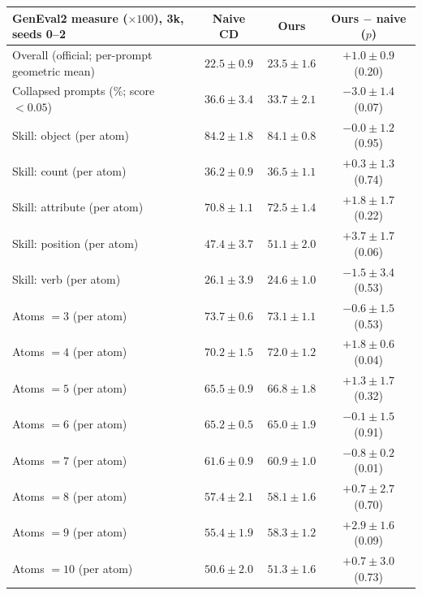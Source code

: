 \begin{tabular}{l c c c}
\toprule
GenEval2 measure ($\times100$), 3k, seeds 0--2 & Naive CD & Ours & Ours $-$ naive ($p$) \\
\midrule
Overall (official; per-prompt geometric mean) & $22.5\pm0.9$ & $23.5\pm1.6$ & $+1.0\pm0.9$ (0.20) \\
Collapsed prompts (\%; score $<0.05$) & $36.6\pm3.4$ & $33.7\pm2.1$ & $-3.0\pm1.4$ (0.07) \\
\midrule
Skill: object (per atom) & $84.2\pm1.8$ & $84.1\pm0.8$ & $-0.0\pm1.2$ (0.95) \\
Skill: count (per atom) & $36.2\pm0.9$ & $36.5\pm1.1$ & $+0.3\pm1.3$ (0.74) \\
Skill: attribute (per atom) & $70.8\pm1.1$ & $72.5\pm1.4$ & $+1.8\pm1.7$ (0.22) \\
Skill: position (per atom) & $47.4\pm3.7$ & $51.1\pm2.0$ & $+3.7\pm1.7$ (0.06) \\
Skill: verb (per atom) & $26.1\pm3.9$ & $24.6\pm1.0$ & $-1.5\pm3.4$ (0.53) \\
\midrule
Atoms $=3$ (per atom) & $73.7\pm0.6$ & $73.1\pm1.1$ & $-0.6\pm1.5$ (0.53) \\
Atoms $=4$ (per atom) & $70.2\pm1.5$ & $72.0\pm1.2$ & $+1.8\pm0.6$ (0.04) \\
Atoms $=5$ (per atom) & $65.5\pm0.9$ & $66.8\pm1.8$ & $+1.3\pm1.7$ (0.32) \\
Atoms $=6$ (per atom) & $65.2\pm0.5$ & $65.0\pm1.9$ & $-0.1\pm1.5$ (0.91) \\
Atoms $=7$ (per atom) & $61.6\pm0.9$ & $60.9\pm1.0$ & $-0.8\pm0.2$ (0.01) \\
Atoms $=8$ (per atom) & $57.4\pm2.1$ & $58.1\pm1.6$ & $+0.7\pm2.7$ (0.70) \\
Atoms $=9$ (per atom) & $55.4\pm1.9$ & $58.3\pm1.2$ & $+2.9\pm1.6$ (0.09) \\
Atoms $=10$ (per atom) & $50.6\pm2.0$ & $51.3\pm1.6$ & $+0.7\pm3.0$ (0.73) \\
\bottomrule
\end{tabular}